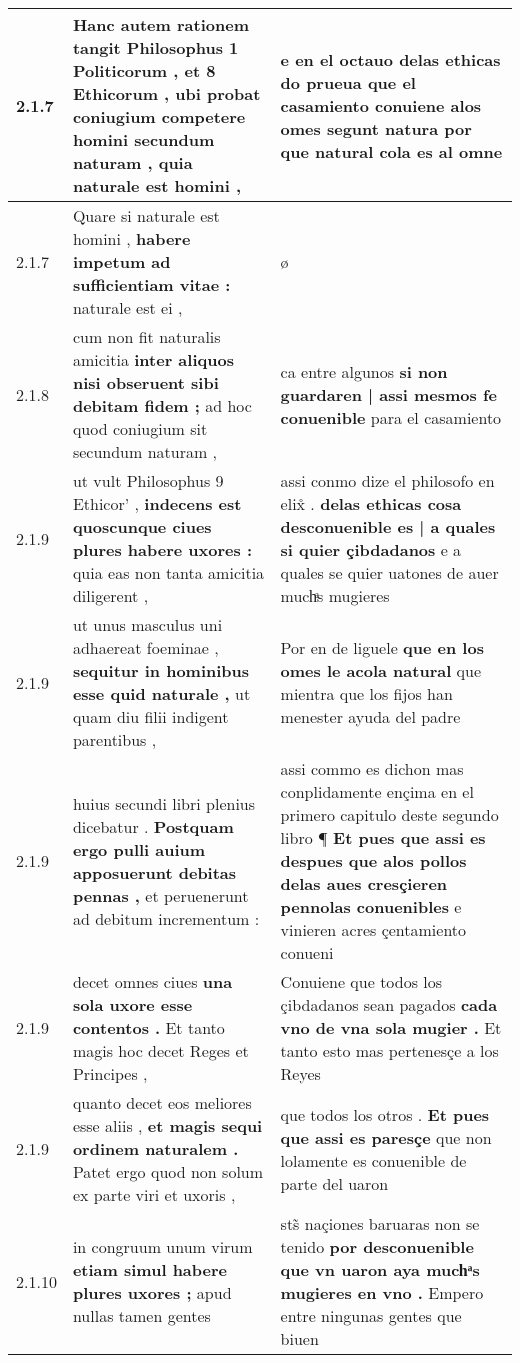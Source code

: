\begin{tabular}{|p{1cm}|p{6.5cm}|p{6.5cm}|}
2.1.7 & Hanc autem rationem tangit Philosophus 1 Politicorum , et 8 Ethicorum , \textbf{ ubi probat coniugium competere homini secundum naturam , } quia naturale est homini , & e en el octauo delas ethicas do prueua \textbf{ que el casamiento conuiene alos omes segunt natura } por que natural cola es al omne \\\hline
2.1.7 & Quare si naturale est homini , \textbf{ habere impetum ad sufficientiam vitae : } naturale est ei , & ø \\\hline
2.1.8 & cum non fit naturalis amicitia \textbf{ inter aliquos nisi obseruent sibi debitam fidem ; } ad hoc quod coniugium sit secundum naturam , & ca entre algunos \textbf{ si non guardaren | assi mesmos fe conuenible } para el casamiento \\\hline
2.1.9 & ut vult Philosophus 9 Ethicor’ , \textbf{ indecens est quoscunque ciues plures habere uxores : } quia eas non tanta amicitia diligerent , & assi conmo dize el philosofo en elix̊ . \textbf{ delas ethicas cosa desconuenible es | a quales si quier çibdadanos } e a quales se quier uatones de auer muchͣs mugieres \\\hline
2.1.9 & ut unus masculus uni adhaereat foeminae , \textbf{ sequitur in hominibus esse quid naturale , } ut quam diu filii indigent parentibus , & Por en de liguele \textbf{ que en los omes le acola natural } que mientra que los fijos han menester ayuda del padre \\\hline
2.1.9 & huius secundi libri plenius dicebatur . \textbf{ Postquam ergo pulli auium apposuerunt debitas pennas , } et peruenerunt ad debitum incrementum : & assi commo es dichon mas conplidamente ençima en el primero capitulo deste segundo libro ¶ \textbf{ Et pues que assi es despues que alos pollos delas aues cresçieren pennolas conuenibles } e vinieren acres çentamiento conueni \\\hline
2.1.9 & decet omnes ciues \textbf{ una sola uxore esse contentos . } Et tanto magis hoc decet Reges et Principes , & Conuiene que todos los çibdadanos sean pagados \textbf{ cada vno de vna sola mugier . } Et tanto esto mas pertenesçe a los Reyes \\\hline
2.1.9 & quanto decet eos meliores esse aliis , \textbf{ et magis sequi ordinem naturalem . } Patet ergo quod non solum ex parte viri et uxoris , & que todos los otros . \textbf{ Et pues que assi es paresçe } que non lolamente es conuenible de parte del uaron \\\hline
2.1.10 & in congruum unum virum \textbf{ etiam simul habere plures uxores ; } apud nullas tamen gentes & sts̃ naçiones baruaras non se tenido \textbf{ por desconuenible que vn uaron aya muchͣs mugieres en vno . } Empero entre ningunas gentes que biuen \\\hline

\end{tabular}

